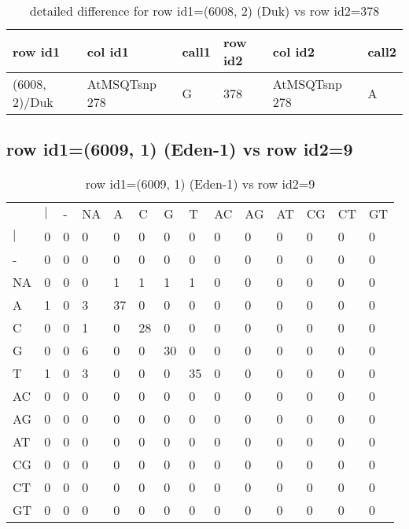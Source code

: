 \begin{center}
\begin{longtable}{|l|l|l|l|l|l|}
\caption{detailed difference for row id1=(6008, 2) (Duk) vs row id2=378} \label{table_dm9}\\
\hline
row id1&col id1&call1&row id2&col id2&call2\\
\hline
(6008, 2)/Duk&AtMSQTsnp 278&G&378&AtMSQTsnp 278&A\\
\hline
\end{longtable}
\end{center}

\subsection{row id1=(6009, 1) (Eden-1) vs row id2=9}
\begin{center}
\begin{longtable}{|l|l|l|l|l|l|l|l|l|l|l|l|l|l|}
\caption{row id1=(6009, 1) (Eden-1) vs row id2=9} \label{table_dm10}\\
\hline
\\
\hline
&$|$&-&NA&A&C&G&T&AC&AG&AT&CG&CT&GT\\
$|$&0&0&0&0&0&0&0&0&0&0&0&0&0\\
-&0&0&0&0&0&0&0&0&0&0&0&0&0\\
NA&0&0&0&1&1&1&1&0&0&0&0&0&0\\
A&1&0&3&37&0&0&0&0&0&0&0&0&0\\
C&0&0&1&0&28&0&0&0&0&0&0&0&0\\
G&0&0&6&0&0&30&0&0&0&0&0&0&0\\
T&1&0&3&0&0&0&35&0&0&0&0&0&0\\
AC&0&0&0&0&0&0&0&0&0&0&0&0&0\\
AG&0&0&0&0&0&0&0&0&0&0&0&0&0\\
AT&0&0&0&0&0&0&0&0&0&0&0&0&0\\
CG&0&0&0&0&0&0&0&0&0&0&0&0&0\\
CT&0&0&0&0&0&0&0&0&0&0&0&0&0\\
GT&0&0&0&0&0&0&0&0&0&0&0&0&0\\
\hline
\end{longtable}
\end{center}

